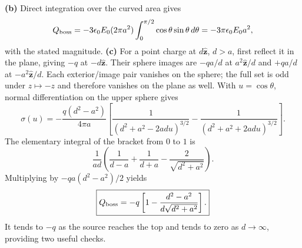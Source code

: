 \textbf{(b)} Direct integration over the curved area gives
\[
Q_{\rm boss}=-3\epsilon _0E_0(2\pi a^2)
 \int_0^{\pi/2}\cos\theta\sin\theta\,d\theta
=-3\pi\epsilon _0E_0a^2,
\]
with the stated magnitude.
\textbf{(c)} For a point charge at $d\widehat{\mathbf z}$, $d>a$,
first reflect it in the plane, giving $-q$ at $-d\widehat{\mathbf z}$.
Their sphere images are $-qa/d$ at $a^2\widehat{\mathbf z}/d$
and $+qa/d$ at $-a^2\widehat{\mathbf z}/d$. Each exterior/image pair
vanishes on the sphere; the full set is odd under $z\mapsto-z$ and
therefore vanishes on the plane as well. With $u=\cos\theta$, normal
differentiation on the upper sphere gives
\[
\sigma(u)=-\frac{q(d^2-a^2)}{4\pi a}
 \left[\frac1{(d^2+a^2-2adu)^{3/2}}
       -\frac1{(d^2+a^2+2adu)^{3/2}}\right].
\]
The elementary integral of the bracket from $0$ to $1$ is
\[
\frac1{ad}\left(\frac1{d-a}+\frac1{d+a}
                         -\frac2{\sqrt{d^2+a^2}}\right).
\]
Multiplying by $-qa(d^2-a^2)/2$ yields
\[
\boxed{Q_{\rm boss}=-q\left[1-
       \frac{d^2-a^2}{d\sqrt{d^2+a^2}}\right].}
\]
It tends to $-q$ as the source reaches the top and tends to zero as
$d\to\infty$, providing two useful checks.

